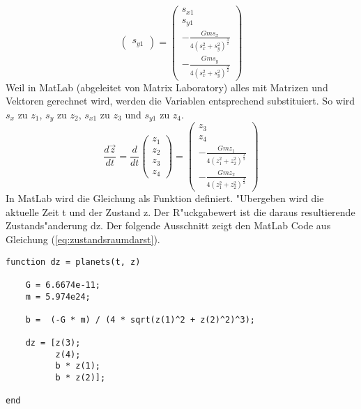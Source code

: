 \begin{refsection}
\begin{equation}
\begin{pmatrix}
s_{y1}
\end{pmatrix} = \begin{pmatrix}
s_{x1} \\ 
s_{y1}\\
-\frac{G m s_x}{4(s_x^2 + s_y^2)^\frac32} \\
-\frac{G m s_y}{4(s_x^2 + s_y^2)^\frac32}
\end{pmatrix}
\end{equation}
Weil in MatLab (abgeleitet von Matrix Laboratory) alles mit Matrizen und Vektoren gerechnet wird, werden die Variablen entsprechend substituiert. So wird $s_x$ zu $z_1$, $s_y$ zu $z_2$, $s_{x1}$ zu $z_3$ und $s_{y1}$ zu $z_4$.
\begin{equation}\label{eq:zustandsraumdarst}
\frac{d \vec{z}}{dt}=\frac{d}{dt} \begin{pmatrix}
z_1 \\ 
z_2 \\
z_3 \\
z_4
\end{pmatrix} = \begin{pmatrix}
z_3 \\ 
z_4 \\
-\frac{G m z_1}{4(z_1^2 + z_2^2)^\frac32} \\
-\frac{G m z_2}{4(z_1^2 + z_2^2)^\frac32}
\end{pmatrix}
\end{equation}
In MatLab wird die Gleichung als Funktion definiert.
"Ubergeben wird die aktuelle Zeit t und der Zustand z.
Der R"uckgabewert ist die daraus resultierende  Zustands"anderung dz.
Der folgende Ausschnitt zeigt den MatLab Code aus Gleichung (\ref{eq:zustandsraumdarst}).
\begin{lstlisting}[style=Matlab]
function dz = planets(t, z)

    G = 6.6674e-11;
    m = 5.974e24;

    b =  (-G * m) / (4 * sqrt(z(1)^2 + z(2)^2)^3);
    
    dz = [z(3);
          z(4);
          b * z(1);
          b * z(2)];
      
end
\end{lstlisting}








\end{refsection}

